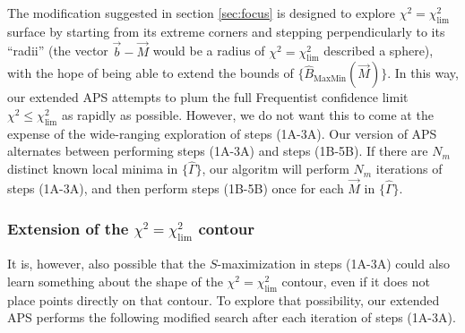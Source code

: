 \documentclass[useAMS,usenatbib]{aastex}
\begin{document}
The modification suggested in section \ref{sec:focus} is designed to explore 
$\chi^2=\chi^2_\text{lim}$ surface by starting from its extreme corners and stepping
perpendicularly to its ``radii'' (the vector $\vec{b}-\vec{M}$ would be a radius of
$\chi^2=\chi^2_\text{lim}$ described a sphere), with the hope of being able
to extend the bounds of $\{\hat{B}_\text{MaxMin}(\vec{M})\}$.  In this way,
our extended APS attempts to plum the full Frequentist confidence limit $\chi^2\le\chi^2_\text{lim}$
as rapidly as possible.  However, we do not want this to come at the expense of the wide-ranging
exploration of steps (1A-3A).  Our version of APS alternates between performing steps (1A-3A) and steps
(1B-5B).  If there are $N_m$ distinct known local minima in $\{\hat{\Gamma}\}$, 
our algoritm will perform
$N_m$ iterations of steps (1A-3A), and then perform steps (1B-5B) once for each
$\vec{M}$ in $\{\hat{\Gamma}\}$.

\subsubsection{Extension of the $\chi^2=\chi^2_\text{lim}$ contour}
\label{sec:unitSphere}

It is, however, also possible
that the $S$-maximization in steps (1A-3A) could also learn something about the
shape of the $\chi^2=\chi^2_\text{lim}$ contour, even if it does not place
points directly on that contour.  To explore that possibility, our
extended APS performs the
following modified search after each iteration of steps (1A-3A).
\end{document}
